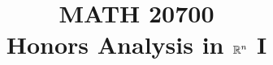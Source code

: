 \documentclass[a4paper, 10pt]{article}
\title{MATH 20700 \\ Honors Analysis in $\mathbb{R}^n$ I}
\begin{document}
    \createintro
    
    
\end{document}
